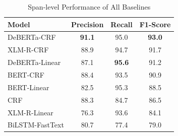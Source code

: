 \begin{table}[ht]
\centering
\caption{Span-level Performance of All Baselines}
\label{tab:span_results}
\begin{tabular}{lccc}
\toprule
\textbf{Model} & \textbf{Precision} & \textbf{Recall} & \textbf{F1-Score} \\
\midrule
DeBERTa-CRF & \textbf{91.1} & 95.0 & \textbf{93.0} \\
XLM-R-CRF & 88.9 & 94.7 & 91.7 \\
DeBERTa-Linear & 87.1 & \textbf{95.6} & 91.2 \\
BERT-CRF & 88.4 & 93.5 & 90.9 \\
BERT-Linear & 82.5 & 95.3 & 88.5 \\
CRF & 88.3 & 84.7 & 86.5 \\
XLM-R-Linear & 76.3 & 93.6 & 84.1 \\
BiLSTM-FastText & 80.7 & 77.4 & 79.0 \\
\bottomrule
\end{tabular}
\end{table}